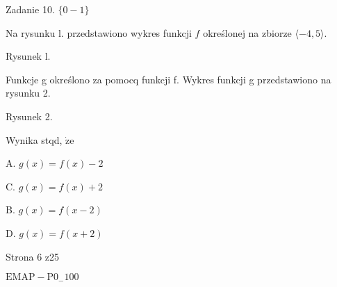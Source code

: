 \documentclass[a4paper,12pt]{article}
\begin{document}
Zadanie 10. $\{0-1\}$

Na rysunku l. przedstawiono wykres funkcji $f$ określonej na zbiorze $\langle-4, 5\rangle.$

Rysunek l.

Funkcje g określono za pomocq funkcji f. Wykres funkcji g przedstawiono na rysunku 2.

Rysunek 2.

Wynika stqd, $\dot{\mathrm{z}}\mathrm{e}$

A. $g(x)=f(x)-2$

C. $g(x)=f(x)+2$

B. $g(x)=f(x-2)$

D. $g(x)=f(x+2)$

Strona 6 z25

$\mathrm{E}\mathrm{M}\mathrm{A}\mathrm{P}-\mathrm{P}0_{-}100$
\end{document}
